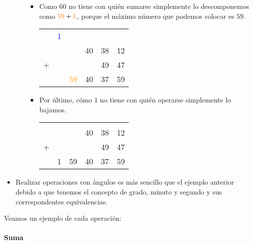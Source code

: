 \begin{itemize}
\begin{itemize}
\begin{itemize}
			\item Como 60 no tiene con quién sumarse simplemente lo 
			descomponemos como $\textcolor{orange}{59} + \textcolor{orange}{1}$, 
			porque el máximo número que podemos colocar
			es $59$. 
			\begin{center}
				\begin{tabular}{c c c c c c}
						&\textcolor{blue}{1}&& & & \\
						&&& 40 & 38 & 12 \\
					+ &&&   & 49 & 47 \\
					\hline
					&&\textcolor{orange}{59} & 40		& 37   & 59
				\end{tabular}
			\end{center}

			\item Por último, cómo $1$ no tiene con quién operarse simplemente lo 
			bajamos.
			\begin{center}
				\begin{tabular}{c c c c c c}
						&&& & & \\
						&&& 40 & 38 & 12 \\
					+ &&&   & 49 & 47 \\
					\hline
					&1&59 & 40		& 37   & 59
				\end{tabular}
			\end{center}
		\end{itemize}
	\end{itemize}

	\item Realizar operaciones con ángulos es más sencillo que el ejemplo 
	anterior debido a que tenemos el concepto de grado, minuto y segundo y sus 
	correspondentes equivalencias.
\end{itemize}

Veamos un ejemplo de cada operación:
\paragraph{Suma}

